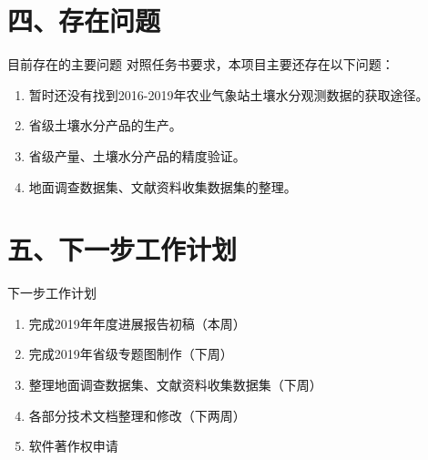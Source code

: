 \documentclass{beamer}
\begin{document}
\section{四、存在问题}
\begin{frame}{目前存在的主要问题}
对照任务书要求，本项目主要还存在以下问题：
\begin{enumerate}
	\item 暂时还没有找到2016-2019年农业气象站土壤水分观测数据的获取途径。
	\item 省级土壤水分产品的生产。
	\item 省级产量、土壤水分产品的精度验证。
	\item 地面调查数据集、文献资料收集数据集的整理。
\end{enumerate}
\end{frame}
\section{五、下一步工作计划}
\begin{frame}{下一步工作计划}
	\begin{enumerate}
		\item 完成2019年年度进展报告初稿（本周）
		\item 完成2019年省级专题图制作（下周）
		\item 整理地面调查数据集、文献资料收集数据集（下周）
		\item 各部分技术文档整理和修改（下两周）
		\item 软件著作权申请
	\end{enumerate}
\end{frame}
\end{document}
